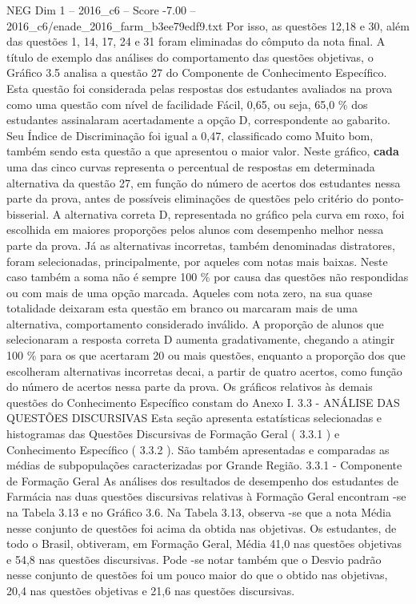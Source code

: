\begin{textsample}{NEG Dim 1 – 2016\_c6 – Score -7.00 – 2016\_c6/enade\_2016\_farm\_b3ee79edf9.txt}
Por isso, as questões 12,18 e 30, além das questões 1, 14, 17, 24 e 31 foram eliminadas do cômputo da nota final.
A título de exemplo das análises do comportamento das questões objetivas, o Gráfico 3.5 analisa a questão 27 do Componente de Conhecimento Específico.
Esta questão foi considerada pelas respostas dos estudantes avaliados na prova como uma questão com nível de facilidade Fácil, 0,65, ou seja, 65,0 \% dos estudantes assinalaram acertadamente a opção D, correspondente ao gabarito.
Seu Índice de Discriminação foi igual a 0,47, classificado como Muito bom, também sendo esta questão a que apresentou o maior valor.
Neste gráfico, \textbf{cada} uma das cinco curvas representa o percentual de respostas em determinada alternativa da questão 27, em função do número de acertos dos estudantes nessa parte da prova, antes de possíveis eliminações de questões pelo critério do ponto-bisserial.
A alternativa correta D, representada no gráfico pela curva em roxo, foi escolhida em maiores proporções pelos alunos com desempenho melhor nessa parte da prova.
Já as alternativas incorretas, também denominadas distratores, foram selecionadas, principalmente, por aqueles com notas mais baixas.
Neste caso também a soma não é sempre 100 \% por causa das questões não respondidas ou com mais de uma opção marcada.
Aqueles com nota zero, na sua quase totalidade deixaram esta questão em branco ou marcaram mais de uma alternativa, comportamento considerado inválido.
A proporção de alunos que selecionaram a resposta correta D aumenta gradativamente, chegando a atingir 100 \% para os que acertaram 20 ou mais questões, enquanto a proporção dos que escolheram alternativas incorretas decai, a partir de quatro acertos, como função do número de acertos nessa parte da prova.
Os gráficos relativos às demais questões do Conhecimento Específico constam do Anexo I. 3.3 - ANÁLISE DAS QUESTÕES DISCURSIVAS Esta seção apresenta estatísticas selecionadas e histogramas das Questões Discursivas de Formação Geral ( 3.3.1 ) e Conhecimento Específico ( 3.3.2 ).
São também apresentadas e comparadas as médias de subpopulações caracterizadas por Grande Região. 3.3.1 - Componente de Formação Geral As análises dos resultados de desempenho dos estudantes de Farmácia nas duas questões discursivas relativas à Formação Geral encontram -se na Tabela 3.13 e no Gráfico 3.6.
Na Tabela 3.13, observa -se que a nota Média nesse conjunto de questões foi acima da obtida nas objetivas.
Os estudantes, de todo o Brasil, obtiveram, em Formação Geral, Média 41,0 nas questões objetivas e 54,8 nas questões discursivas.
Pode -se notar também que o Desvio padrão nesse conjunto de questões foi um pouco maior do que o obtido nas objetivas, 20,4 nas questões objetivas e 21,6 nas questões discursivas.

\end{textsample}

